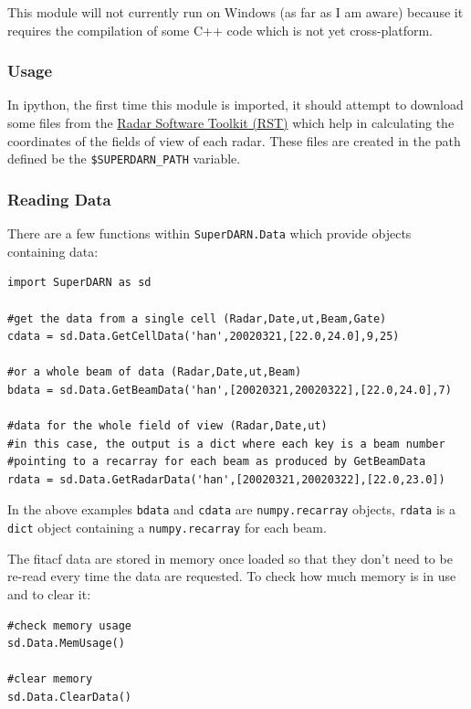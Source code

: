 			This module will not currently run on Windows (as far as I am aware) because it requires the compilation of some C++ code which is not yet cross-platform.

		\subsubsection{Usage}
		
			In ipython, the first time this module is imported, it should attempt to download some files from the \href{https://github.com/SuperDARN/rst}{Radar Software Toolkit (RST)} which help in calculating the coordinates of the fields of view of each radar. These files are created in the path defined be the \texttt{\$SUPERDARN_PATH} variable.

			\subsubsection{Reading Data}
				There are a few functions within \texttt{SuperDARN.Data} which provide objects containing data:

				\begin{verbatim}
import SuperDARN as sd
			
#get the data from a single cell (Radar,Date,ut,Beam,Gate)
cdata = sd.Data.GetCellData('han',20020321,[22.0,24.0],9,25)
			
#or a whole beam of data (Radar,Date,ut,Beam)
bdata = sd.Data.GetBeamData('han',[20020321,20020322],[22.0,24.0],7)
			
#data for the whole field of view (Radar,Date,ut)
#in this case, the output is a dict where each key is a beam number
#pointing to a recarray for each beam as produced by GetBeamData
rdata = sd.Data.GetRadarData('han',[20020321,20020322],[22.0,23.0])
				\end{verbatim}
			
				In the above examples \texttt{bdata} and \texttt{cdata} are \texttt{numpy.recarray} objects, \texttt{rdata} is a \texttt{dict} object containing a \texttt{numpy.recarray} for each beam.
			
				The fitacf data are stored in memory once loaded so that they don't need to be re-read every time the data are requested. To check how much memory is in use and to clear it:
			
				\begin{verbatim}
#check memory usage
sd.Data.MemUsage()
		
#clear memory
sd.Data.ClearData()
				\end{verbatim}
			
